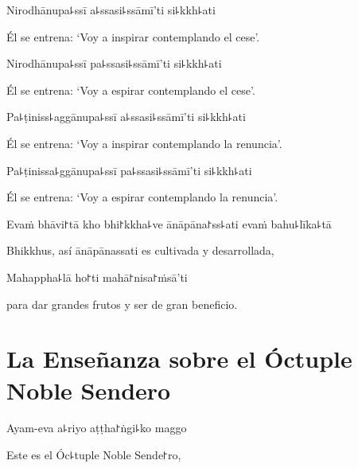 Nirodhānupa꜕ssī a꜕ssasi꜕ssāmī'ti si꜕kkh꜕ati

\begin{english}
  Él se entrena: ‘Voy a inspirar contemplando el cese’.
\end{english}

Nirodhānupa꜕ssī pa꜕ssasi꜕ssāmī'ti si꜕kkh꜕ati

\begin{english}
  Él se entrena: ‘Voy a espirar contemplando el cese’.
\end{english}

Pa꜕ṭiniss꜕aggānupa꜕ssī a꜕ssasi꜕ssāmī'ti si꜕kkh꜕ati

\begin{english}
  Él se entrena: ‘Voy a inspirar contemplando la renuncia’.
\end{english}

Pa꜕ṭinissa꜕ggānupa꜕ssī pa꜕ssasi꜕ssāmī'ti si꜕kkh꜕ati

\begin{english}
  Él se entrena: ‘Voy a espirar contemplando la renuncia’.
\end{english}

Evaṁ bhāvi꜓tā kho bhi꜓kkha꜕ve ānāpāna꜓ss꜕ati evaṁ bahu꜕līka꜕tā

\begin{english}
  Bhikkhus, así ānāpānassati es cultivada y desarrollada,
\end{english}

Mahappha꜕lā ho꜓ti mahā꜓nisa꜓ṁsā'ti

\begin{english}
  para dar grandes frutos y ser de gran beneficio.
\end{english}


\chapter[El Óctuple Noble Sendero]{La Enseñanza sobre el Óctuple Noble Sendero}




\begin{leader}
\end{leader}

Ayam-eva a꜕riyo aṭṭha꜓ṅgi꜕ko maggo

\begin{english}
	Este es el Óc꜕tuple Noble Sende꜓ro,
\end{english}

